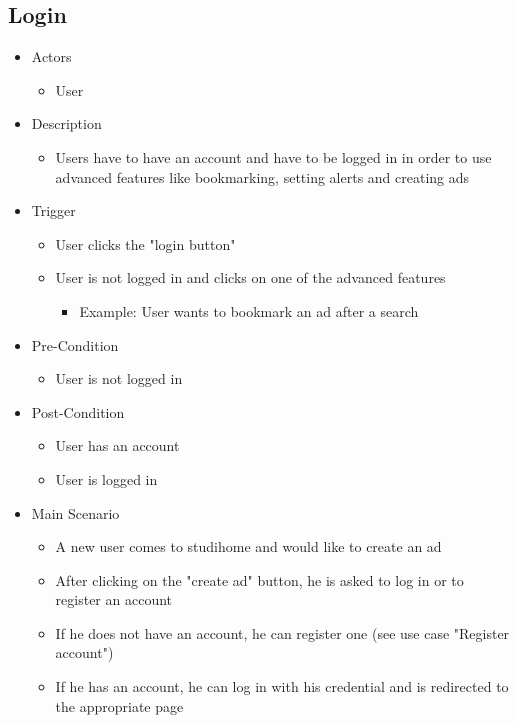 \documentclass[a4paper,11pt]{article}
\begin{document}
\subsection*{Login}
\begin{itemize}
	\item Actors
		\begin{itemize}
			\item User
		\end{itemize}
	\item Description
		\begin{itemize}
			\item Users have to have an account and have to be logged in in order to use advanced features like bookmarking, setting alerts and creating ads
		\end{itemize}
	\item Trigger
		\begin{itemize}
			\item User clicks the "login button"
			\item User is not logged in and clicks on one of the advanced features
			\begin{itemize}
				\item Example: User wants to bookmark an ad after a search
			\end{itemize}
		\end{itemize}
	\item Pre-Condition
		\begin{itemize}
			\item User is not logged in
		\end{itemize}
	\item Post-Condition
		\begin{itemize}
			\item User has an account
			\item User is logged in
		\end{itemize}
	\item Main Scenario
		\begin{itemize}
			\item A new user comes to studihome and would like to create an ad
			\item After clicking on the "create ad" button, he is asked to log in or to register an account
			\item If he does not have an account, he can register one (see use case "Register account")
			\item If he has an account, he can log in with his credential and is redirected to the appropriate page
		\end{itemize}
\end{itemize}
\end{document}
